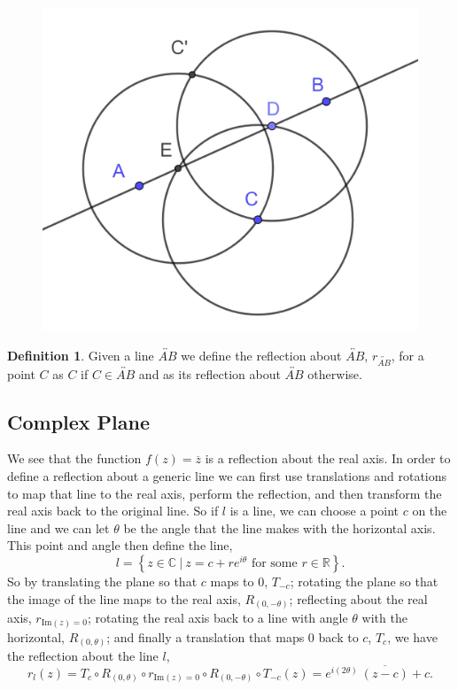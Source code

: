 \documentclass[
]{book}
\theoremstyle{definition}
\newtheorem{definition}{Definition}[chapter]
\theoremstyle{definition}
\theoremstyle{definition}
\theoremstyle{definition}
\theoremstyle{remark}
\begin{document}
\begin{figure}

{\centering \includegraphics[width=0.35\linewidth]{images/Reflection_Synthetic} 

}

\end{figure}

\begin{definition}
Given a line \(\overleftrightarrow{AB}\) we define the reflection about \(\overleftrightarrow{AB}\), \(r_{\overleftrightarrow{AB}}\), for a point \(C\) as \(C\) if \(C\in \overleftrightarrow{AB}\) and as its reflection about \(\overleftrightarrow{AB}\) otherwise.
\end{definition}

\hypertarget{complex-plane-3}{%
\subsection{Complex Plane}\label{complex-plane-3}}

We see that the function \(f(z)=\overline{z}\) is a reflection about the real axis. In order to define a reflection about a generic line we can first use translations and rotations to map that line to the real axis, perform the reflection, and then transform the real axis back to the original line. So if \(l\) is a line, we can choose a point \(c\) on the line and we can let \(\theta\) be the angle that the line makes with the horizontal axis. This point and angle then define the line,
\[l = \left\{ z\in \mathbb{C} \: \vert \: z=c+re^{i\theta} \mbox{ for some } r\in \mathbb{R} \right\}.\] So by translating the plane so that \(c\) maps to \(0\), \(T_{-c}\); rotating the plane so that the image of the line maps to the real axis, \(R_{(0,-\theta)}\); reflecting about the real axis, \(r_{\mbox{Im}(z)=0}\); rotating the real axis back to a line with angle \(\theta\) with the horizontal, \(R_{(0,\theta)}\); and finally a translation that maps \(0\) back to \(c\), \(T_{c}\), we have the reflection about the line \(l\),
\[r_l (z) = T_c \circ R_{(0,\theta)} \circ r_{\mbox{Im}(z)=0} \circ R_{(0,-\theta)} \circ T_{-c} (z) = e^{i(2\theta )} \: \overline{(z-c)} +c.\]
\end{document}
